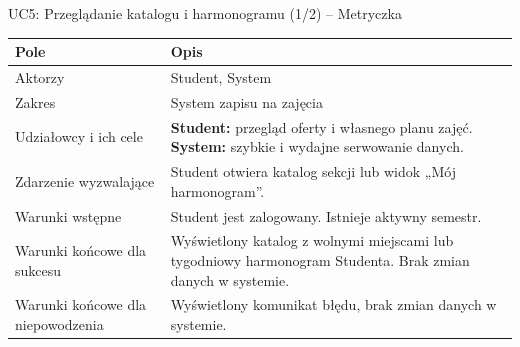 \documentclass[aspectratio=169, 10pt, xcolor=table]{beamer}
\renewcommand{\arraystretch}{1.18}
\begin{document}
\begin{frame}{UC5: Przeglądanie katalogu i harmonogramu (1/2) -- Metryczka}
    \scriptsize
    \renewcommand{\arraystretch}{1.18}
    \begin{tabularx}{\textwidth}{|U{3.6cm}|Y|}
        \hline
        \textcolor{NavyPrimary}{\textbf{Pole}} & \textcolor{NavyPrimary}{\textbf{Opis}} \\
        \hline
        Aktorzy & Student, System \\
        \hline
        Zakres & System zapisu na zajęcia \\
        \hline
        Udziałowcy i ich cele & \textbf{Student:} przegląd oferty i własnego planu zajęć. \textbf{System:} szybkie i wydajne serwowanie danych. \\
        \hline
        Zdarzenie wyzwalające & Student otwiera katalog sekcji lub widok „Mój harmonogram”. \\
        \hline
        Warunki wstępne & Student jest zalogowany. Istnieje aktywny semestr. \\
        \hline
        Warunki końcowe dla sukcesu & Wyświetlony katalog z wolnymi miejscami lub tygodniowy harmonogram Studenta. Brak zmian danych w systemie. \\
        \hline
        Warunki końcowe dla niepowodzenia & Wyświetlony komunikat błędu, brak zmian danych w systemie. \\
        \hline
    \end{tabularx}
\end{frame}
\end{document}
